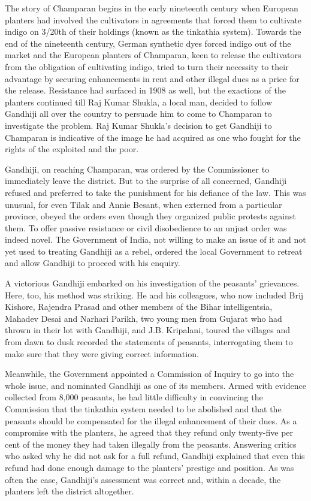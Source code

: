 The story of Champaran begins in the early nineteenth century when European planters had involved the cultivators in agreements that forced them to cultivate indigo on 3/20th of their holdings (known as the tinkathia system). Towards the end of the nineteenth century, German synthetic dyes forced indigo out of the market and the European planters of Champaran, keen to release the cultivators from the obligation of cultivating indigo, tried to turn their necessity to their advantage by securing enhancements in rent and other illegal dues as a price for the release. Resistance had surfaced in 1908 as well, but the exactions of the planters continued till Raj Kumar Shukla, a local man, decided to follow Gandhiji all over the country to persuade him to come to Champaran to investigate the problem. Raj Kumar Shukla's decision to get Gandhiji to Champaran is indicative of the image he had acquired as one who fought for the rights of the exploited and the poor.

Gandhiji, on reaching Champaran, was ordered by the Commissioner to immediately leave the district. But to the surprise of all concerned, Gandhiji refused and preferred to take the punishment for his defiance of the law. This was unusual, for even Tilak and Annie Besant, when externed from a particular province, obeyed the orders even though they organized public protests against them. To offer passive resistance or civil disobedience to an unjust order was indeed novel. The Government of India, not willing to make an issue of it and not yet used to treating Gandhiji as a rebel, ordered the local Government to retreat and allow Gandhiji to proceed with his enquiry.

A victorious Gandhiji embarked on his investigation of the peasants' grievances. Here, too, his method was striking. He and his colleagues, who now included Brij Kishore, Rajendra Prasad and other members of the Bihar intelligentsia, Mahadev Desai and Narhari Parikh, two young men from Gujarat who had thrown in their lot with Gandhiji, and J.B. Kripalani, toured the villages and from dawn to dusk recorded the statements of peasants, interrogating them to make sure that they were giving correct information.

Meanwhile, the Government appointed a Commission of Inquiry to go into the whole issue, and nominated Gandhiji as one of its members. Armed with evidence collected from 8,000 peasants, he had little difficulty in convincing the Commission that the tinkathia system needed to be abolished and that the peasants should be compensated for the illegal enhancement of their dues. As a compromise with the planters, he agreed that they refund only twenty-five per cent of the money they had taken illegally from the peasants. Answering critics who asked why he did not ask for a full refund, Gandhiji explained that even this refund had done enough damage to the planters' prestige and position. As was often the case, Gandhiji's assessment was correct and, within a decade, the planters left the district altogether.

